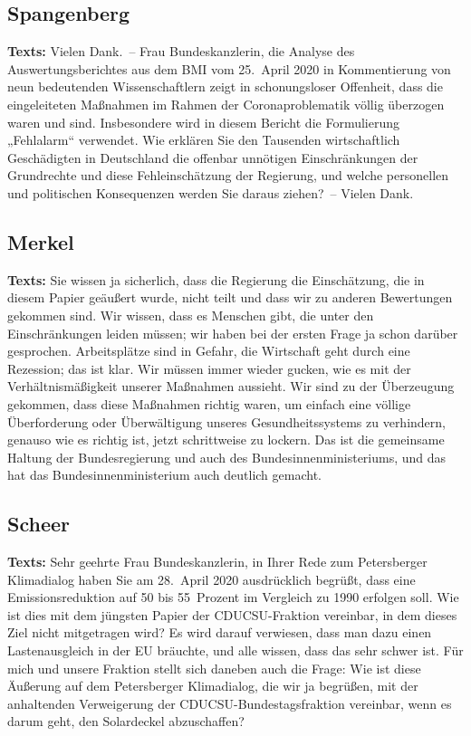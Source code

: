 \documentclass{article}
\begin{document}
\subsection{Spangenberg}
\noindent\textbf{Texts:} Vielen Dank. – Frau Bundeskanzlerin, die Analyse des Auswertungsberichtes aus dem BMI vom 25. April 2020 in Kommentierung von neun bedeutenden Wissenschaftlern zeigt in schonungsloser Offenheit, dass die eingeleiteten Maßnahmen im Rahmen der Coronaproblematik völlig überzogen waren und sind. Insbesondere wird in diesem Bericht die Formulierung „Fehlalarm“ verwendet. Wie erklären Sie den Tausenden wirtschaftlich Geschädigten in Deutschland die offenbar unnötigen Einschränkungen der Grundrechte und diese Fehleinschätzung der Regierung, und welche personellen und politischen Konsequenzen werden Sie daraus ziehen? – Vielen Dank.

\subsection{Merkel}
\noindent\textbf{Texts:} Sie wissen ja sicherlich, dass die Regierung die Einschätzung, die in diesem Papier geäußert wurde, nicht teilt und dass wir zu anderen Bewertungen gekommen sind. Wir wissen, dass es Menschen gibt, die unter den Einschränkungen leiden müssen; wir haben bei der ersten Frage ja schon darüber gesprochen. Arbeitsplätze sind in Gefahr, die Wirtschaft geht durch eine Rezession; das ist klar. Wir müssen immer wieder gucken, wie es mit der Verhältnismäßigkeit unserer Maßnahmen aussieht. Wir sind zu der Überzeugung gekommen, dass diese Maßnahmen richtig waren, um einfach eine völlige Überforderung oder Überwältigung unseres Gesundheitssystems zu verhindern, genauso wie es richtig ist, jetzt schrittweise zu lockern. Das ist die gemeinsame Haltung der Bundesregierung und auch des Bundesinnenministeriums, und das hat das Bundesinnenministerium auch deutlich gemacht.

\subsection{Scheer}
\noindent\textbf{Texts:} Sehr geehrte Frau Bundeskanzlerin, in Ihrer Rede zum Petersberger Klimadialog haben Sie am 28. April 2020 ausdrücklich begrüßt, dass eine Emissionsreduktion auf 50 bis 55 Prozent im Vergleich zu 1990 erfolgen soll. Wie ist dies mit dem jüngsten Papier der CDU\/CSU-Fraktion vereinbar, in dem dieses Ziel nicht mitgetragen wird? Es wird darauf verwiesen, dass man dazu einen Lastenausgleich in der EU bräuchte, und alle wissen, dass das sehr schwer ist. Für mich und unsere Fraktion stellt sich daneben auch die Frage: Wie ist diese Äußerung auf dem Petersberger Klimadialog, die wir ja begrüßen, mit der anhaltenden Verweigerung der CDU\/CSU-Bundestagsfraktion vereinbar, wenn es darum geht, den Solardeckel abzuschaffen?
\end{document}
